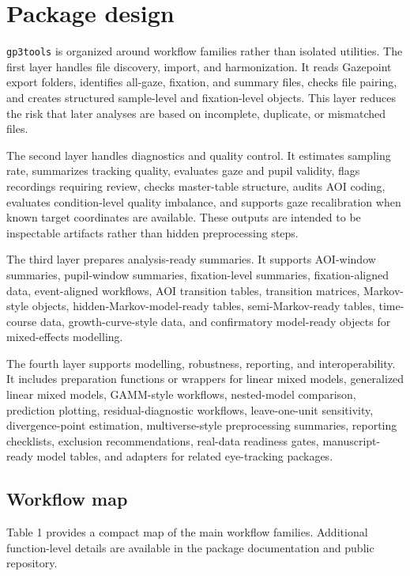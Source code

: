 \documentclass[
]{article}
\begin{document}
\section{Package design}\label{package-design}

\texttt{gp3tools} is organized around workflow families rather than
isolated utilities. The first layer handles file discovery, import, and
harmonization. It reads Gazepoint export folders, identifies all-gaze,
fixation, and summary files, checks file pairing, and creates structured
sample-level and fixation-level objects. This layer reduces the risk
that later analyses are based on incomplete, duplicate, or mismatched
files.

The second layer handles diagnostics and quality control. It estimates
sampling rate, summarizes tracking quality, evaluates gaze and pupil
validity, flags recordings requiring review, checks master-table
structure, audits AOI coding, evaluates condition-level quality
imbalance, and supports gaze recalibration when known target coordinates
are available. These outputs are intended to be inspectable artifacts
rather than hidden preprocessing steps.

The third layer prepares analysis-ready summaries. It supports
AOI-window summaries, pupil-window summaries, fixation-level summaries,
fixation-aligned data, event-aligned workflows, AOI transition tables,
transition matrices, Markov-style objects, hidden-Markov-model-ready
tables, semi-Markov-ready tables, time-course data, growth-curve-style
data, and confirmatory model-ready objects for mixed-effects modelling.

The fourth layer supports modelling, robustness, reporting, and
interoperability. It includes preparation functions or wrappers for
linear mixed models, generalized linear mixed models, GAMM-style
workflows, nested-model comparison, prediction plotting,
residual-diagnostic workflows, leave-one-unit sensitivity,
divergence-point estimation, multiverse-style preprocessing summaries,
reporting checklists, exclusion recommendations, real-data readiness
gates, manuscript-ready model tables, and adapters for related
eye-tracking packages.

\subsection{Workflow map}\label{workflow-map}

Table 1 provides a compact map of the main workflow families. Additional
function-level details are available in the package documentation and
public repository.
\end{document}

